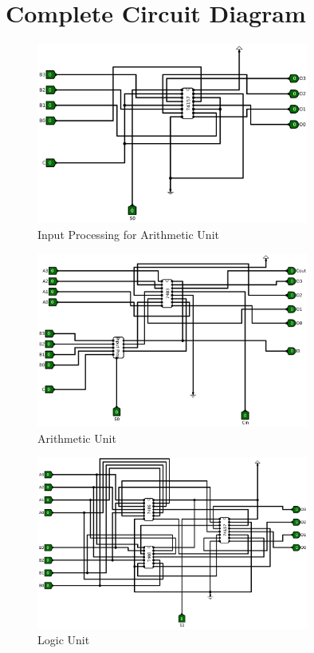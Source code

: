 \documentclass[12pt]{article}
\begin{document}
\section{\large{Complete Circuit Diagram}}

     \begin{figure}[H]
         \centering
         \includegraphics[width=0.8\textwidth]{Input for AU.png}
         \caption{Input Processing for Arithmetic Unit}
         \label{fig:alu_a}
     \end{figure}
     \begin{figure}[H]
         \centering
         \includegraphics[width=0.8\textwidth]{Arithmetic Unit.png}
         \caption{Arithmetic Unit}
         \label{fig:alu_b}
     \end{figure}
     \begin{figure}[H]
         \centering
         \includegraphics[width=0.8\textwidth]{Logic Unit.png}
         \caption{Logic Unit}
         \label{fig:alu_c}
     \end{figure}
\end{document}
